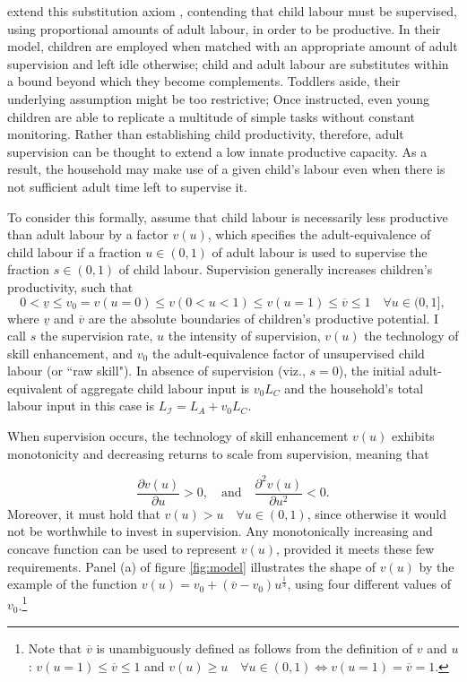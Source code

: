 \documentclass[a4paper,12pt]{article}
\theoremstyle{plain}
\theoremstyle{definition}
\theoremstyle{definition}
\theoremstyle{definition}
\theoremstyle{definition}
\begin{document}
\citet{Bar2009} extend this substitution axiom \citep{Basu1998}, contending that child labour must be supervised, using proportional amounts of adult labour, in order to be productive. In their model, children are employed when matched with an appropriate amount of adult supervision and left idle otherwise; child and adult labour are substitutes within a bound beyond which they become complements. Toddlers aside, their underlying assumption might be too restrictive; Once instructed, even young children are able to replicate a multitude of simple tasks without constant monitoring. Rather than establishing child productivity, therefore, adult supervision can be thought to extend a low innate productive capacity. As a result, the household may make use of a given child's labour even when there is not sufficient adult time left to supervise it. 

To consider this formally, assume that child labour is necessarily less productive than adult labour by a factor $v(u)$, which specifies the adult-equivalence of child labour if a fraction $u\in (0,1)$ of adult labour is used to supervise the fraction $s\in (0,1)$ of child labour. Supervision generally increases children's productivity, such that
$$0< \underline{v}\leq v_0 = v(u=0)\leq v(0<u<1) \leq v(u=1)\leq\overline{v}\leq 1 \quad \forall u \in (0,1],$$
where $\underline{v}$ and $\overline{v}$ are the absolute boundaries of children's productive potential. I call $s$ the supervision rate, $u$ the intensity of supervision, $v(u)$ the technology of skill enhancement, and $v_0$ the adult-equivalence factor of unsupervised child labour (or ``raw skill"). In absence of supervision (viz., $s=0$), the initial adult-equivalent of aggregate child labour input is $v_0 L_C$ and the household's total labour input in this case is $L_{\mathcal{I}}=L_A + v_0 L_C$.

When supervision occurs, the technology of skill enhancement $v(u)$ exhibits monotonicity and decreasing returns to scale from supervision, meaning that

$$\frac{\partial v(u)}{\partial u}>0, \quad \text{and} \quad \frac{\partial^2 v(u)}{\partial u^2} < 0.$$
Moreover, it must hold that $v(u) > u \quad \forall u \in (0,1)$, since otherwise it would not be worthwhile to invest in supervision. Any monotonically increasing and concave function can be used to represent $v(u)$, provided it meets these few requirements. Panel (a) of figure \ref{fig:model} illustrates the shape of $v(u)$ by the example of the function $v(u)=v_0+(\overline{v}-v_0)u^{\frac{1}{3}}$, using four different values of $v_0$.\footnote{Note that $\overline{v}$ is unambiguously defined as follows from the definition of $v$ and $u$: $v(u=1)\leq\overline{v}\leq 1$ and $v(u)\geq u \quad \forall u \in (0,1) \iff v(u=1)=\overline{v}=1$.}
\end{document}
